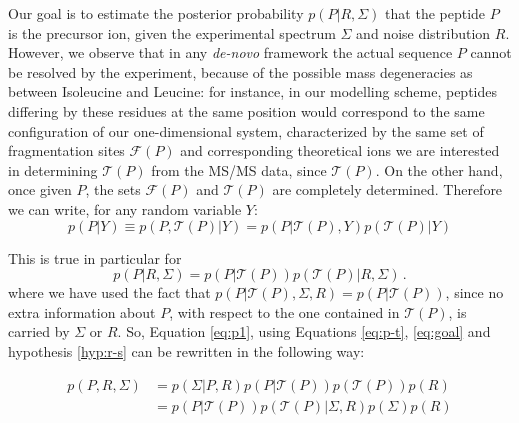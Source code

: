 Our goal is to estimate the posterior probability $p(P\vert R,\Sigma)$ that the
peptide $P$ is the precursor ion, given the experimental spectrum $\Sigma$ and
noise distribution $R$. However, we observe that in any \emph{de-novo} framework
the actual sequence $P$ cannot be resolved by the experiment, because of the
possible  mass degeneracies as between Isoleucine and Leucine: for instance, in
our modelling scheme, peptides differing by these residues at the same position
would correspond to the same configuration of our one-dimensional system,
characterized by the same set of fragmentation sites $\mathcal F(P)$ and
corresponding theoretical ions
we are interested in determining $\mathcal T(P)$ from the MS/MS data, since
$\mathcal T(P)$.
% 
On the other hand, once given $P$,  the sets $\mathcal F(P)$ and $\mathcal T(P)$
are completely determined.
Therefore we can write, for any random variable $Y$:
\begin{equation}
p(P \vert Y)\equiv p(P,\mathcal T(P)\vert Y)=p(P|\mathcal T(P), Y)p(\mathcal T(P)\vert Y)
\label{eq:p-t}
\end{equation} 

This is true in particular for 
\begin{equation}
 p(P \vert R,\Sigma)=p(P \vert \mathcal T(P)) p(\mathcal T(P)\vert R,\Sigma)\,.
\label{eq:goal}
\end{equation}
where we have used the fact that  $ p(P \vert \mathcal T(P), \Sigma, R)=p(P
\vert \mathcal T(P))$, since no extra information about $P$, with respect to the
one contained in $\mathcal T(P)$, is carried by $\Sigma$ or $R$.
So, Equation \ref{eq:p1}, using Equations \ref{eq:p-t}, \ref{eq:goal} and hypothesis
\ref{hyp:r-s} can be rewritten in the following way:

\begin{align}
p(P,R,\Sigma)&=p(\Sigma \vert P,R) p(P|\mathcal T(P)) p(\mathcal T(P)) p( R)\\
&= p(P \vert \mathcal T(P)) p( \mathcal T(P) \vert \Sigma, R)  p(\Sigma) p(R)
\label{eq:p2}
\end{align}
% 

